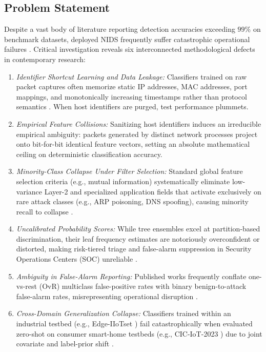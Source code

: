 \documentclass[10pt,journal,twocolumn]{IEEEtran}
\begin{document}
\subsection{Problem Statement}
Despite a vast body of literature reporting detection accuracies exceeding $99\%$ on benchmark datasets, deployed NIDS frequently suffer catastrophic operational failures \cite{ref8,ref10}. Critical investigation reveals six interconnected methodological defects in contemporary research:
\begin{enumerate}
    \item \emph{Identifier Shortcut Learning and Data Leakage:} Classifiers trained on raw packet captures often memorize static IP addresses, MAC addresses, port mappings, and monotonically increasing timestamps rather than protocol semantics \cite{ref6,ref7}. When host identifiers are purged, test performance plummets.
    \item \emph{Empirical Feature Collisions:} Sanitizing host identifiers induces an irreducible empirical ambiguity: packets generated by distinct network processes project onto bit-for-bit identical feature vectors, setting an absolute mathematical ceiling on deterministic classification accuracy.
    \item \emph{Minority-Class Collapse Under Filter Selection:} Standard global feature selection criteria (e.g., mutual information) systematically eliminate low-variance Layer-2 and specialized application fields that activate exclusively on rare attack classes (e.g., ARP poisoning, DNS spoofing), causing minority recall to collapse \cite{ref16}.
    \item \emph{Uncalibrated Probability Scores:} While tree ensembles excel at partition-based discrimination, their leaf frequency estimates are notoriously overconfident or distorted, making risk-tiered triage and false-alarm suppression in Security Operations Centers (SOC) unreliable \cite{ref9,ref21}.
    \item \emph{Ambiguity in False-Alarm Reporting:} Published works frequently conflate one-vs-rest (OvR) multiclass false-positive rates with binary benign-to-attack false-alarm rates, misrepresenting operational disruption \cite{ref5}.
    \item \emph{Cross-Domain Generalization Collapse:} Classifiers trained within an industrial testbed (e.g., Edge-IIoTset \cite{ref1}) fail catastrophically when evaluated zero-shot on consumer smart-home testbeds (e.g., CIC-IoT-2023 \cite{ref2}) due to joint covariate and label-prior shift \cite{ref10}.
\end{enumerate}
\end{document}
